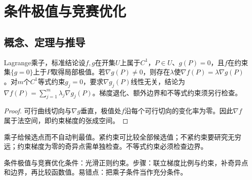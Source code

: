 \section{条件极值与竞赛优化}\label{sec:6:5}
\subsection{概念、定理与推导}

\begin{theorem}{Lagrange乘子，标准结论}设$f,g$在开集$U$上属于$C^1$，$P\in U$、$g(P)=0$，且$f$在约束集$\{g=0\}$上于$P$取得局部极值。若$\nabla g(P)\ne0$，则存在$\lambda$使$\nabla f(P)=\lambda\nabla g(P)$。对$m$个$C^1$等式约束$g_j=0$，要求$\nabla g_j(P)$线性无关，结论为$\nabla f(P)=\sum_{j=1}^m\lambda_j\nabla g_j(P)$。梯度退化、额外边界和不等式约束须另行检查。\end{theorem}
\begin{proof}可行曲线切向与$\nabla g$垂直，极值处$f$沿每个可行切向的变化率为零。因此$\nabla f$属于法空间，即约束梯度的张成空间。\end{proof}
\begin{extension}乘子给候选点而不自动判最值。紧约束可比较全部候选值；不紧约束要研究无穷远；约束梯度为零的奇异点需单独检查。不等式约束必须检查边界。\end{extension}

\begin{method}{条件极值与竞赛优化}条件：光滑正则约束。步骤：联立梯度比例与约束，补奇异点和边界，再比较函数值。易错点：把乘子条件当作充分条件。\end{method}
